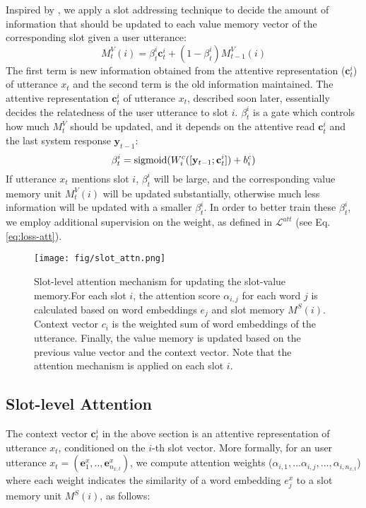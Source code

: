 Inspired by \cite{graves2014neural,miller2016key}, we apply a slot addressing technique to decide the amount of information that should be updated to each value memory vector of the corresponding slot given a user utterance:
\begin{equation}
    M_t^V(i)={\beta_t^i}{\mathbf{c}_t^i}+(1-\beta_t^i)M_{t-1}^V(i)
\end{equation} 
The first term is new information obtained from the attentive representation ($\mathbf{c}_t^i$) of utterance $x_t$ and the second term is the old information maintained. The attentive representation $\mathbf{c}_t^i$ of utterance $x_t$, described soon later, essentially decides the relatedness of the user utterance to slot $i$.
$\beta_t^i$ is a gate which controls how much $M_t^V$ should be updated, and it depends on the attentive read $\mathbf{c}_t^i$ and the last system response $\mathbf{y}_{t-1}$:
\begin{equation} \label{eq:updategate}
    \beta_t^i= {\rm sigmoid}(W_i^c([\mathbf{y}_{t-1};\mathbf{c}_t^i])+b_i^c)
\end{equation}
%   
If utterance $x_t$ mentions slot $i$, $\beta_t^i$ will be large, and the corresponding value memory unit $M_t^V(i)$ will be updated substantially, otherwise much less information will be updated with a smaller $\beta_t^i$. In order to better train these $\beta_t^i$, we employ additional supervision on the weight, as defined in $\mathcal{L}^{att}$ (see Eq. \ref{eq:loss-att}).


\begin{figure}
  \texttt{[image: fig/slot\_attn.png]}
  \caption{
  Slot-level attention mechanism for updating the slot-value memory.For each slot $i$, the attention score $\alpha_{i,j}$ for each word $j$ is calculated based on word embeddings $e_j$ and slot memory $M^S(i)$. Context vector $c_i$ is the weighted sum of word embeddings of the utterance. Finally, the value memory is updated based on the previous value vector and the context vector. Note that the attention mechanism is applied on each slot $i$.
  }
  \label{fig:slot_attn}
\end{figure}


\subsection{Slot-level Attention}
The context vector $\mathbf{c}_t^i$ in the above section is an attentive representation of utterance $x_t$, conditioned on the $i$-th slot vector. 
More formally, for an user utterance $x_t=(\mathbf{e}_1^x,..,\mathbf{e}_{n_{x,t}}^x)$, we compute attention weights ($\alpha_{i,1},...\alpha_{i,j},...,\alpha_{i,{n_{x,t}}}$) where each weight indicates the similarity of a word embedding $e^x_j$ to a slot memory unit $M^S(i)$, as follows:

